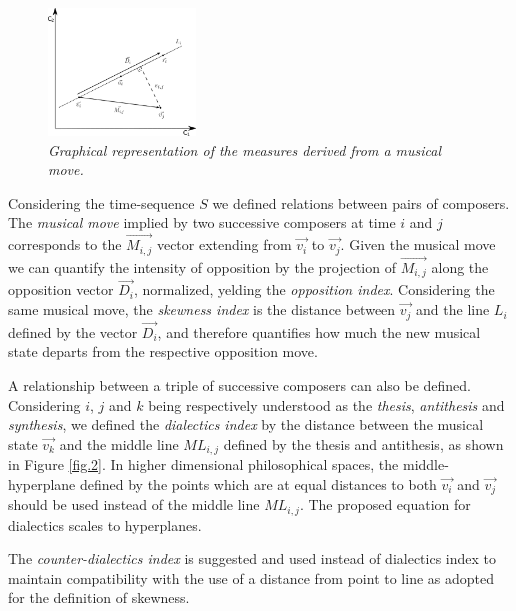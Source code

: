 \documentclass[
 aip,
 jmp,
 amsmath,amssymb,
 reprint,
]{revtex4-1}
\begin{document}
\begin{figure}
        \begin{center}
                \includegraphics[width=0.35\textwidth]{phil-space-desc_}
        \end{center}
        \caption{\it Graphical representation of the measures derived from a \emph{musical move}\cite{Fabbri}.}
        \label{fig.1}
\end{figure}

Considering the time-sequence $S$ we defined relations between pairs of composers. The \emph{musical move} implied by two successive composers at time $i$ and $j$ corresponds to the $\vec{M_{i,j}}$ vector extending from $\vec{v_i}$ to $\vec{v_j}$. Given the musical move we can quantify the intensity of opposition by the projection of $\vec{M_{i,j}}$ along the opposition vector $\vec{D_i}$, normalized, yelding the \emph{opposition index}. Considering the same musical move, the \emph{skewness index} is the distance between $\vec{v_j}$ and the line $L_i$ defined by the vector $\vec{D_i}$, and therefore quantifies how much the new
musical state departs from the respective opposition move.

A relationship between a triple of successive composers can also be defined. Considering $i$, $j$ and $k$ being respectively understood as the \emph{thesis}, \emph{antithesis} and \emph{synthesis}, we defined the \emph{dialectics index} by the distance between the musical state $\vec{v_k}$ and the middle line $ML_{i,j}$ defined by the thesis and antithesis, as shown in Figure \ref{fig.2}. In higher dimensional philosophical spaces,
the middle-hyperplane defined by the points which are at equal
distances to both $\vec{v_i}$ and $\vec{v_j}$ should be used instead
of the middle line $ML_{i,j}$. The proposed equation for dialectics scales to hyperplanes.

The \emph{counter-dialectics index} is suggested and used instead of dialectics index to maintain compatibility with the use of a distance from point to line as adopted for the definition of skewness.
\end{document}
